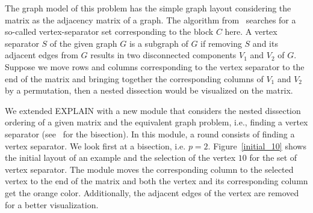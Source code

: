 \documentclass[12pt, twoside,a4paper,toc=bibliography]{scrbook}
\begin{document}
The graph model of this problem has the simple graph layout considering the matrix
as the adjacency matrix of a graph.
The algorithm from~\cite{2014:02} searches for a so-called vertex-separator set
corresponding to the block $C$ here. A vertex separator $S$ of the given graph $G$
is a subgraph of $G$ if removing $S$ and its adjacent edges from $G$ results in two
disconnected components $V_1$ and $V_2$ of $G$.
Suppose we move rows and columns corresponding to the vertex separator to the end of
the matrix and bringing together
the corresponding columns of $V_1$ and $V_2$ by a permutation,
then a nested dissection would be visualized on the matrix.

We extended \mbox{EXPLAIN} with
a new module that considers the nested dissection ordering
of a given matrix and the equivalent graph problem, i.e.,
finding a vertex separator (see~\cite{2014:02} for the bisection).
In this module, a round consists of finding a vertex separator.
We look first at a bisection, i.e. $p=2$.
Figure~\ref{initial_10} shows the initial layout of an example
and the selection of the vertex $10$ for the set of vertex separator. The module moves the
corresponding column to the selected vertex to the end of the matrix
and both the vertex and its corresponding column get the orange color.
Additionally, the adjacent edges of the vertex are removed for a better visualization.
\end{document}
